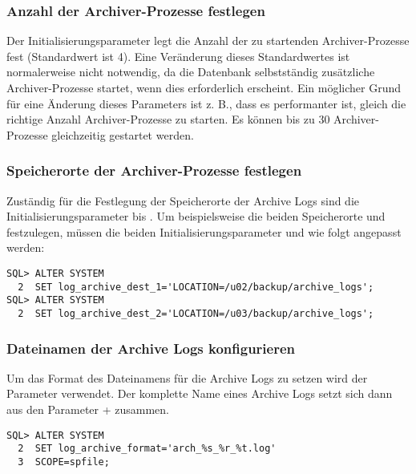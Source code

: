         \subsubsection{Anzahl der Archiver-Prozesse festlegen}
          Der Initialisierungsparameter  legt die Anzahl der zu startenden Archiver-Prozesse fest (Standardwert ist 4). Eine Veränderung dieses Standardwertes ist normalerweise nicht notwendig, da die Datenbank selbstständig zusätzliche Archiver-Prozesse startet, wenn dies erforderlich erscheint.
\clearpage
					Ein möglicher Grund für eine Änderung dieses Parameters ist z. B., dass es  performanter ist, gleich die richtige Anzahl Archiver-Prozesse zu starten. Es können bis zu 30 Archiver-Prozesse gleichzeitig gestartet werden.

        \subsubsection{Speicherorte der Archiver-Prozesse festlegen}
         Zuständig für die Festlegung der Speicherorte der Archive Logs sind die Initialisierungsparameter  bis . Um beispielsweise die beiden Speicherorte  und  festzulegen, müssen die beiden Initialisierungsparameter  und  wie folgt angepasst werden:
          \begin{lstlisting}[caption={log\_archive\_dest-Parameter setzen},label=admin48,language=oracle_sql]
SQL> ALTER SYSTEM
  2  SET log_archive_dest_1='LOCATION=/u02/backup/archive_logs';
SQL> ALTER SYSTEM
  2  SET log_archive_dest_2='LOCATION=/u03/backup/archive_logs';
          \end{lstlisting}
        \subsubsection{Dateinamen der Archive Logs konfigurieren}
          Um das Format des Dateinamens für die Archive Logs zu setzen wird der Parameter  verwendet. Der komplette Name eines Archive Logs setzt sich dann aus den Parameter  +  zusammen.
          \begin{lstlisting}[caption={\parameter{log\_archive\_format}-Parameter
          setzen},label=admin49,language=oracle_sql,alsolanguage=sqlplus]
SQL> ALTER SYSTEM
  2  SET log_archive_format='arch_%s_%r_%t.log'
  3  SCOPE=spfile;
          \end{lstlisting}
    
